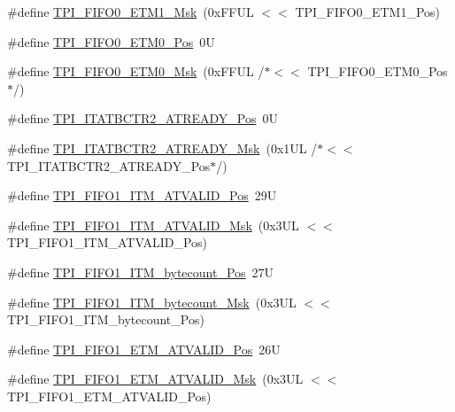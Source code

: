 \begin{DoxyCompactItemize}
\item 
\#define \hyperlink{group___c_m_s_i_s___t_p_i_gaad9c1a6ed34a70905005a0cc14d5f01b}{T\+P\+I\+\_\+\+F\+I\+F\+O0\+\_\+\+E\+T\+M1\+\_\+\+Msk}~(0x\+F\+F\+U\+L $<$$<$ T\+P\+I\+\_\+\+F\+I\+F\+O0\+\_\+\+E\+T\+M1\+\_\+\+Pos)
\item 
\#define \hyperlink{group___c_m_s_i_s___t_p_i_ga48783ce3c695d8c06b1352a526110a87}{T\+P\+I\+\_\+\+F\+I\+F\+O0\+\_\+\+E\+T\+M0\+\_\+\+Pos}~0U
\item 
\#define \hyperlink{group___c_m_s_i_s___t_p_i_gaf924f7d1662f3f6c1da12052390cb118}{T\+P\+I\+\_\+\+F\+I\+F\+O0\+\_\+\+E\+T\+M0\+\_\+\+Msk}~(0x\+F\+F\+U\+L /$\ast$$<$$<$ T\+P\+I\+\_\+\+F\+I\+F\+O0\+\_\+\+E\+T\+M0\+\_\+\+Pos$\ast$/)
\item 
\#define \hyperlink{group___c_m_s_i_s___t_p_i_ga6959f73d7db4a87ae9ad9cfc99844526}{T\+P\+I\+\_\+\+I\+T\+A\+T\+B\+C\+T\+R2\+\_\+\+A\+T\+R\+E\+A\+D\+Y\+\_\+\+Pos}~0U
\item 
\#define \hyperlink{group___c_m_s_i_s___t_p_i_ga1859502749709a2e5ead9a2599d998db}{T\+P\+I\+\_\+\+I\+T\+A\+T\+B\+C\+T\+R2\+\_\+\+A\+T\+R\+E\+A\+D\+Y\+\_\+\+Msk}~(0x1\+U\+L /$\ast$$<$$<$ T\+P\+I\+\_\+\+I\+T\+A\+T\+B\+C\+T\+R2\+\_\+\+A\+T\+R\+E\+A\+D\+Y\+\_\+\+Pos$\ast$/)
\item 
\#define \hyperlink{group___c_m_s_i_s___t_p_i_ga08edfc862b2c8c415854cc4ae2067dfb}{T\+P\+I\+\_\+\+F\+I\+F\+O1\+\_\+\+I\+T\+M\+\_\+\+A\+T\+V\+A\+L\+I\+D\+\_\+\+Pos}~29U
\item 
\#define \hyperlink{group___c_m_s_i_s___t_p_i_gabc1f6a3b6cac0099d7c01ca949b4dd08}{T\+P\+I\+\_\+\+F\+I\+F\+O1\+\_\+\+I\+T\+M\+\_\+\+A\+T\+V\+A\+L\+I\+D\+\_\+\+Msk}~(0x3\+U\+L $<$$<$ T\+P\+I\+\_\+\+F\+I\+F\+O1\+\_\+\+I\+T\+M\+\_\+\+A\+T\+V\+A\+L\+I\+D\+\_\+\+Pos)
\item 
\#define \hyperlink{group___c_m_s_i_s___t_p_i_gaa22ebf7c86e4f4b2c98cfd0b5981375a}{T\+P\+I\+\_\+\+F\+I\+F\+O1\+\_\+\+I\+T\+M\+\_\+bytecount\+\_\+\+Pos}~27U
\item 
\#define \hyperlink{group___c_m_s_i_s___t_p_i_gacba2edfc0499828019550141356b0dcb}{T\+P\+I\+\_\+\+F\+I\+F\+O1\+\_\+\+I\+T\+M\+\_\+bytecount\+\_\+\+Msk}~(0x3\+U\+L $<$$<$ T\+P\+I\+\_\+\+F\+I\+F\+O1\+\_\+\+I\+T\+M\+\_\+bytecount\+\_\+\+Pos)
\item 
\#define \hyperlink{group___c_m_s_i_s___t_p_i_ga3177b8d815cf4a707a2d3d3d5499315d}{T\+P\+I\+\_\+\+F\+I\+F\+O1\+\_\+\+E\+T\+M\+\_\+\+A\+T\+V\+A\+L\+I\+D\+\_\+\+Pos}~26U
\item 
\#define \hyperlink{group___c_m_s_i_s___t_p_i_ga0e8f29a1e9378d1ceb0708035edbb86d}{T\+P\+I\+\_\+\+F\+I\+F\+O1\+\_\+\+E\+T\+M\+\_\+\+A\+T\+V\+A\+L\+I\+D\+\_\+\+Msk}~(0x3\+U\+L $<$$<$ T\+P\+I\+\_\+\+F\+I\+F\+O1\+\_\+\+E\+T\+M\+\_\+\+A\+T\+V\+A\+L\+I\+D\+\_\+\+Pos)

\end{DoxyCompactItemize}
